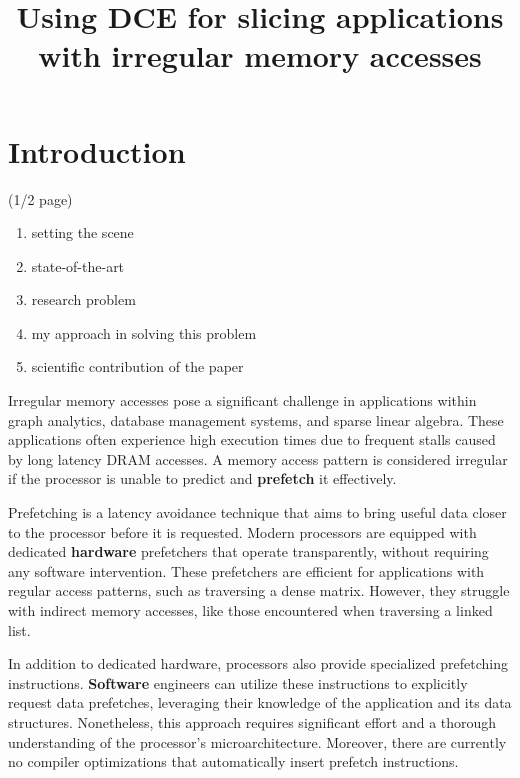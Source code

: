 \documentclass{acaces}
\begin{document}
\title{Using DCE for slicing applications with irregular memory accesses}

\pagestyle{empty}

\begin{abstract}

\end{abstract}


\section{Introduction}

(1/2 page)

\begin{enumerate}
\item setting the scene
\item state-of-the-art
\item research problem
\item my approach in solving this problem
\item scientific contribution of the paper
\end{enumerate}

Irregular memory accesses pose a significant challenge in applications within graph analytics, database management systems, and sparse linear algebra.
These applications often experience high execution times due to frequent stalls caused by long latency DRAM accesses.
A memory access pattern is considered irregular if the processor is unable to predict and \textbf{prefetch} it effectively.

Prefetching is a latency avoidance technique that aims to bring useful data closer to the processor before it is requested.
Modern processors are equipped with dedicated \textbf{hardware} prefetchers that operate transparently, without requiring any software intervention.
These prefetchers are efficient for applications with regular access patterns, such as traversing a dense matrix.
However, they struggle with indirect memory accesses, like those encountered when traversing a linked list.

In addition to dedicated hardware, processors also provide specialized prefetching instructions.
\textbf{Software} engineers can utilize these instructions to explicitly request data prefetches, leveraging their knowledge of the application and its data structures.
Nonetheless, this approach requires significant effort and a thorough understanding of the processor's microarchitecture.
Moreover, there are currently no compiler optimizations that automatically insert prefetch instructions.
\end{document}
